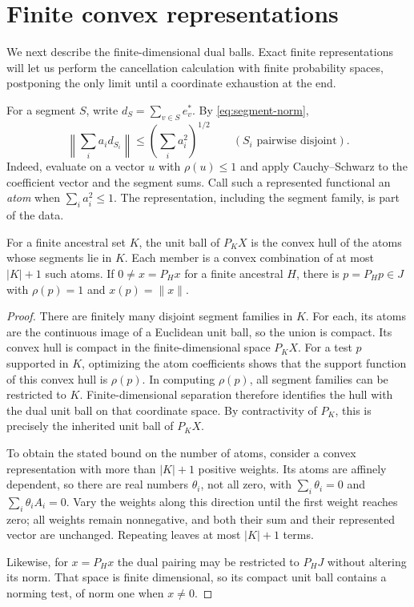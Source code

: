 
\section{Finite convex representations}\label{sec:atoms}

We next describe the finite-dimensional dual balls. Exact finite
representations will let us perform the cancellation calculation with
finite probability spaces, postponing the only limit until a coordinate
exhaustion at the end.

For a segment $S$, write $d_S=\sum_{v\in S}e_v^*$. By
\eqref{eq:segment-norm},
\begin{equation}\label{eq:atom-coefficients}
 \left\|\sum_i a_i d_{S_i}\right\|
 \le\left(\sum_i a_i^2\right)^{1/2}
 \qquad(S_i\text{ pairwise disjoint}).
\end{equation}
Indeed, evaluate on a vector $u$ with $\rho(u)\le1$ and apply
Cauchy--Schwarz to the coefficient vector and the segment sums. Call
such a represented functional an \emph{atom} when $\sum_i a_i^2\le1$.
The representation, including the segment family, is part of the data.

\begin{lemma}\label{lem:finite-hull}
For a finite ancestral set $K$, the unit ball of $P_KX$ is the convex
hull of the atoms whose segments lie in $K$. Each member is a convex
combination of at most $|K|+1$ such atoms. If $0\ne x=P_Hx$ for a
finite ancestral $H$, there is $p=P_Hp\in J$ with $\rho(p)=1$ and
$x(p)=\|x\|$.
\end{lemma}

\begin{proof}
There are finitely many disjoint segment families in $K$. For each,
its atoms are the continuous image of a Euclidean unit ball, so the
union is compact. Its convex hull is compact in the finite-dimensional
space $P_KX$. For a test $p$ supported in $K$, optimizing the atom
coefficients shows that the support function of this convex hull is
$\rho(p)$. In computing $\rho(p)$, all segment families can be
restricted to $K$. Finite-dimensional separation therefore identifies
the hull with the dual unit ball on that coordinate space. By
contractivity of $P_K$, this is precisely the inherited unit ball of
$P_KX$.

To obtain the stated bound on the number of atoms, consider a convex
representation with more than $|K|+1$ positive weights. Its atoms are
affinely dependent, so there are real numbers $\theta_i$, not all zero,
with $\sum_i\theta_i=0$ and $\sum_i\theta_i A_i=0$. Vary the weights
along this direction until the first weight reaches zero; all weights
remain nonnegative, and both their sum and their represented vector
are unchanged. Repeating leaves at most $|K|+1$ terms.

Likewise, for $x=P_Hx$ the dual pairing may be restricted to $P_HJ$
without altering its norm. That space is finite dimensional, so its
compact unit ball contains a norming test, of norm one when $x\ne0$.
\end{proof}

